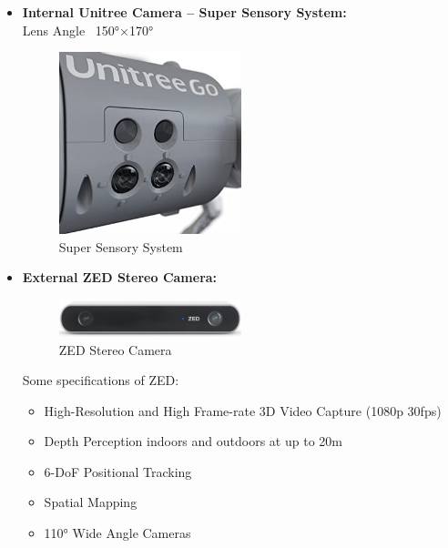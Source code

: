 \documentclass[12pt]{article}
\begin{document}
\begin{itemize}
    \item \textbf{Internal Unitree Camera – Super Sensory System:} \\
          Lens Angle ~150°×170°

          \begin{figure}[H]
              \centering
              \includegraphics[width=0.5\textwidth]{SuperSensorySystem.png}
              \caption{Super Sensory System}
          \end{figure}

    \item \textbf{External ZED Stereo Camera:} \\

          \begin{figure}[H]
              \centering
              \includegraphics[width=0.5\textwidth]{ZEDCam.png}
              \caption{ZED Stereo Camera~\cite{ZEDStereoCamera}}
          \end{figure}

          Some specifications of ZED:

          \begin{itemize}
              \item High-Resolution and High Frame-rate 3D Video Capture (1080p 30fps)
              \item Depth Perception indoors and outdoors at up to 20m
              \item 6-DoF Positional Tracking
              \item Spatial Mapping
              \item 110° Wide Angle Cameras
          \end{itemize}


\end{itemize}
\end{document}
